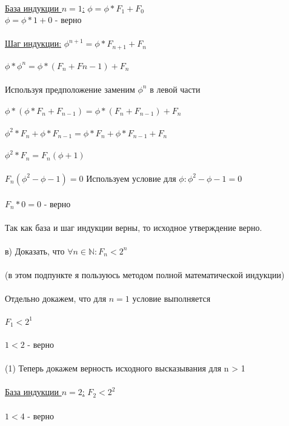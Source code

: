 \documentclass[12pt, a4paper]{article}
\begin{document}
	\\
	\underline{База индукции $n = 1$:} $\phi = \phi * F_1 + F_0$\\
	$\phi = \phi * 1 +  0$ - верно\\
	\\
	\underline{Шаг индукции:} $\phi ^ {n + 1}= \phi * F_{n + 1} + F_{n}$\\
	\\
	$\phi * \phi^{n} = \phi *( F_n  + F{n - 1}) + F_n $\\
	\\
	Используя предположение заменим $\phi^n$ в левой части\\
	\\
	$\phi * (\phi * F_n + F_{n - 1}) = \phi *( F_n  + F_{n - 1}) + F_n $\\
	\\
	$\phi^2 * F_n + \phi * F_{n - 1} = \phi * F_n  + \phi * F_{n - 1} + F_n $\\
	\\
	$\phi^2 * F_n = F_n(\phi + 1)$\\
	\\
	$F_n(\phi^ 2 - \phi  - 1) = 0$
	Используем условие для $\phi: \phi ^ 2 - \phi - 1 = 0$\\
	\\
	$F_n * 0 = 0$ - верно\\
	\\
	Так как база и шаг индукции верны, то исходное утверждение верно.\\
	\\
	в) Доказать, что $\forall n \in \mathbb{N}: F_n < 2 ^ n$\\\\
	(в этом подпункте я пользуюсь методом полной математической индукции)
	\\\\
	Отдельно докажем, что для $n = 1$ условие выполняется\\
	\\
	$F_1 < 2 ^ 1$\\
	\\
	$1 < 2$ - верно\\
	\\
	(1) Теперь докажем верность исходного высказывания для n > 1\\
	\\
	\underline{База индукции $n = 2$:} $F_2 < 2 ^ 2$\\
	\\
	$1 < 4$ - верно\\
	\\
\end{document}
